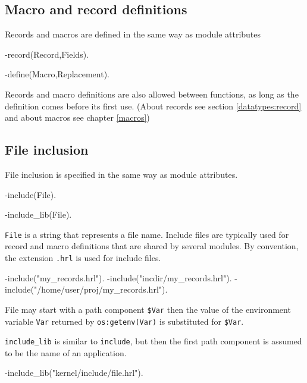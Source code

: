 \subsection{Macro and record definitions}

Records and macros are defined in the same way as module attributes

\begin{erlang}
-record(Record,Fields).

-define(Macro,Replacement).
\end{erlang}

Records and macro definitions are also allowed between functions, as
long as the definition comes before its first use. (About records see
section \ref{datatypes:record} and about macros see chapter \ref{macros})

\subsection{File inclusion}

File inclusion is specified in the same way as module attributes.

\begin{erlang}
-include(File).

-include_lib(File).
\end{erlang}

\texttt{File} is a string that represents a file name. Include files
are typically used for record and macro definitions that are shared by
several modules. By convention, the extension \texttt{.hrl} is used
for include files.

\begin{erlang}
-include("my_records.hrl").
-include("incdir/my_records.hrl").
-include("/home/user/proj/my_records.hrl").
\end{erlang}

File may start with a path component \texttt{\$Var} then the value of
the environment variable \texttt{Var} returned by
\texttt{os:getenv(Var)} is substituted for \texttt{\$Var}.


\texttt{include\_lib} is similar to \texttt{include}, but then the
first path component is assumed to be the name of an application.

\begin{erlang}
-include_lib("kernel/include/file.hrl").
\end{erlang}


